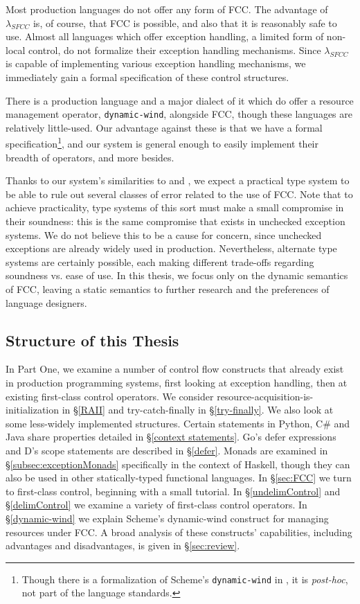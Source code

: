 \documentclass[11pt]{article}
\newcommand{\maybePage}{\newpage}
\begin{document}
Most production languages do not offer any form of FCC.
The advantage of $\lambda_{SFCC}$ is, of course, that FCC is possible, and also that it is reasonably safe to use.
Almost all languages which offer exception handling, a limited form of non-local control, do not formalize their exception handling mechanisms.
Since $\lambda_{SFCC}$ is capable of implementing various exception handling mechanisms, we immediately gain a formal specification of these control structures.

There is a production language and a major dialect of it which do offer a resource management operator, \texttt{dynamic-wind}, alongside FCC, though these languages are relatively little-used.
Our advantage against these is that we have a formal specification\footnote{Though there is a formalization of Scheme's \texttt{dynamic-wind} in \cite{SchemeOpSem}, it is \textit{post-hoc}, not part of the language standards.}, and our system is general enough to easily implement their breadth of operators, and more besides.

Thanks to our system's similarities to \cite{Gunter:1995} and \cite{MFDC}, we expect a practical type system to be able to rule out several classes of error related to the use of FCC.
Note that to achieve practicality, type systems of this sort must make a small compromise in their soundness: this is the same compromise that exists in unchecked exception systems.
We do not believe this to be a cause for concern, since unchecked exceptions are already widely used in production.
Nevertheless, alternate type systems are certainly possible, each making different trade-offs regarding soundness vs. ease of use.
In this thesis, we focus only on the dynamic semantics of FCC, leaving a static semantics to further research and the preferences of language designers.

\maybePage
\subsection{Structure of this Thesis}

In Part One, we examine a number of control flow constructs that already exist in production programming systems, first looking at exception handling, then at existing first-class control operators.
We consider resource-acquisition-is-initialization in \S\ref{RAII} and try-catch-finally in \S\ref{try-finally}.
We also look at some less-widely implemented structures.
Certain statements in Python, C\# and Java share properties detailed in \S\ref{context statements}.
Go's defer expressions and D's scope statements are described in \S\ref{defer}.
Monads are examined in \S\ref{subsec:exceptionMonads} specifically in the context of Haskell, though they can also be used in other statically-typed functional languages.
In \S\ref{sec:FCC} we turn to first-class control, beginning with a small tutorial.
In \S\ref{undelimControl} and \S\ref{delimControl} we examine a variety of first-class control operators.
In \S\ref{dynamic-wind} we explain Scheme's dynamic-wind construct for managing resources under FCC.
A broad analysis of these constructs' capabilities, including advantages and disadvantages, is given in \S\ref{sec:review}.
\end{document}
